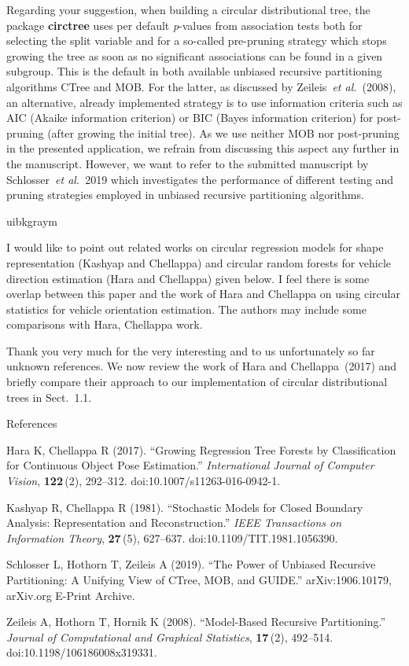 \documentclass[english, noconfig]{uibklttr}
\newenvironment{re}{
    \begin{color}{uibkgraym}
        \itshape
}{
    \end{color}
}
\begin{document}
Regarding your suggestion, when building a circular distributional tree, the
package \textbf{circtree} uses per default \emph{p}-values from association
tests both for selecting the split variable and for a so-called pre-pruning
strategy which stops growing the tree as soon as no significant associations
can be found in a given subgroup. This is the default in both available
unbiased recursive partitioning algorithms CTree and MOB. For the latter, as
discussed by Zeileis~\emph{et al.}~(2008), an alternative, already implemented
strategy  is to use information criteria such as AIC (Akaike information
criterion) or BIC (Bayes information criterion) for post-pruning (after growing
the initial tree).  As we use neither MOB nor post-pruning in the presented
application, we refrain from discussing this aspect any further in the
manuscript. However, we want to refer to the submitted manuscript by
Schlosser~\emph{et al.}~2019 which investigates the performance of different 
testing and pruning strategies employed in unbiased recursive partitioning algorithms.

\vspace{0.5em}
\begin{re}
I would like to point out related works on circular regression models for
shape representation (Kashyap and Chellappa) and circular random forests for
vehicle direction estimation (Hara and Chellappa) given below. I feel there is
some overlap between this paper and the work of Hara and Chellappa on using
circular statistics for vehicle orientation estimation. The authors may include
some comparisons with Hara, Chellappa work.
\end{re}

Thank you very much for the very interesting and to us unfortunately so far unknown references.
We now review the work of Hara and Chellappa~(2017) and briefly compare their approach
to our implementation of circular distributional trees in Sect.~1.1.

\vspace{0.5cm}
References

Hara K, Chellappa R (2017). ``Growing Regression Tree Forests by
Classification for Continuous Object Pose Estimation.'' \emph{International
Journal of Computer Vision}, \textbf{122}\,(2), 292--312.
doi:10.1007/s11263-016-0942-1.

Kashyap R, Chellappa R (1981). ``Stochastic Models for Closed Boundary
Analysis: Representation and Reconstruction.'' \emph{IEEE Transactions on
Information Theory}, \textbf{27}\,(5), 627--637. doi:10.1109/TIT.1981.1056390.

Schlosser L, Hothorn T, Zeileis A (2019). ``The Power of Unbiased Recursive
Partitioning: A Unifying View of CTree, MOB, and GUIDE.'' arXiv:1906.10179,
arXiv.org E-Print Archive.

Zeileis A, Hothorn T, Hornik K (2008). ``Model-Based Recursive Partitioning.''
\emph{Journal of Computational and Graphical Statistics}, \textbf{17}\,(2),
492--514. doi:10.1198/106186008x319331.
\end{document}
